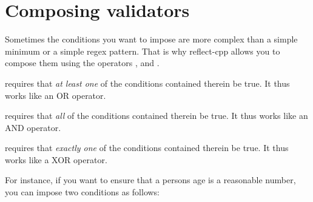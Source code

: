 \chapter{Composing validators}
\hypertarget{md_external_2reflect-cpp_2docs_2composing__validators}{}\label{md_external_2reflect-cpp_2docs_2composing__validators}
\label{md_external_2reflect-cpp_2docs_2composing__validators_autotoc_md531}%
%


Sometimes the conditions you want to impose are more complex than a simple minimum or a simple regex pattern. That is why reflect-\/cpp allows you to compose them using the operators {\ttfamily {}}, {\ttfamily {}} and {\ttfamily {}}.


\begin{DoxyItemize}
\item {\ttfamily {}} requires that {\itshape at least one} of the conditions contained therein be true. It thus works like an OR operator.
\item {\ttfamily {}} requires that {\itshape all} of the conditions contained therein be true. It thus works like an AND operator.
\item {\ttfamily {}} requires that {\itshape exactly one} of the conditions contained therein be true. It thus works like a XOR operator.
\end{DoxyItemize}

For instance, if you want to ensure that a person\textquotesingle{}s age is a reasonable number, you can impose two conditions as follows\+:


\begin{DoxyCode}{0}
\DoxyCodeLine{}
\DoxyCodeLine{\};}

\end{DoxyCode}



